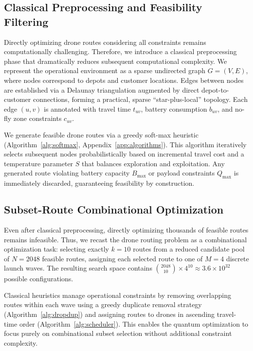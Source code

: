 \subsection{Classical Preprocessing and Feasibility Filtering}

Directly optimizing drone routes considering all constraints remains computationally challenging. Therefore, we introduce a classical preprocessing phase that dramatically reduces subsequent computational complexity. We represent the operational environment as a sparse undirected graph $G=(V,E)$, where nodes correspond to depots and customer locations. Edges between nodes are established via a Delaunay triangulation augmented by direct depot-to-customer connections, forming a practical, sparse ``star-plus-local'' topology. Each edge $(u,v)$ is annotated with travel time $t_{uv}$, battery consumption $b_{uv}$, and no-fly zone constraints $c_{uv}$.

We generate feasible drone routes via a greedy soft-max heuristic (Algorithm~\ref{alg:softmax}, Appendix~\ref{app:algorithms}). This algorithm iteratively selects subsequent nodes probabilistically based on incremental travel cost and a temperature parameter $S$ that balances exploration and exploitation. Any generated route violating battery capacity $B_{\max}$ or payload constraints $Q_{\max}$ is immediately discarded, guaranteeing feasibility by construction.

\subsection{Subset-Route Combinational Optimization}

Even after classical preprocessing, directly optimizing thousands of feasible routes remains infeasible. Thus, we recast the drone routing problem as a combinational optimization task: selecting exactly $k=10$ routes from a reduced candidate pool of $N=2048$ feasible routes, assigning each selected route to one of $M=4$ discrete launch waves. The resulting search space contains $\binom{2048}{10} \times 4^{10} \approx 3.6 \times 10^{32}$ possible configurations.

Classical heuristics manage operational constraints by removing overlapping routes within each wave using a greedy duplicate removal strategy (Algorithm~\ref{alg:dropdup}) and assigning routes to drones in ascending travel-time order (Algorithm~\ref{alg:scheduler}). This enables the quantum optimization to focus purely on combinational subset selection without additional constraint complexity.

